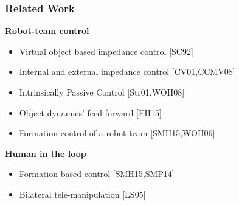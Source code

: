 \documentclass[student]{ITRslides}
\begin{document}
\begin{frame}
	\frametitle{Related Work}
	\textbf{Robot-team control}
	\begin{itemize}
		\item Virtual object based impedance control \nocite{Schneider_92} {\tiny [SC92]} 
				\item Internal and external impedance control \nocite{Caccavale_01,Caccavale_08} {\tiny [CV01,CCMV08]} 
	
		\item Intrinsically Passive Control \nocite{Stramigioli_01, Wimboeck_08} {\tiny [Str01,WOH08]} 
		\item Object dynamics' feed-forward \nocite{Erhart_15} {\tiny [EH15]} 
	\item Formation control of a robot team \nocite{Sieber_15,Wimboeck_06}{\tiny [SMH15,WOH06]} 
	\end{itemize}
	\textbf{Human in the loop}
	\begin{itemize}	
		\item Formation-based control \nocite{Sieber_15, Scheggi_14}{\tiny [SMH15,SMP14]} 
		\item Bilateral tele-manipulation  \nocite{Lee_05} {\tiny [LS05]} 


\end{itemize}
\end{frame}
\end{document}

